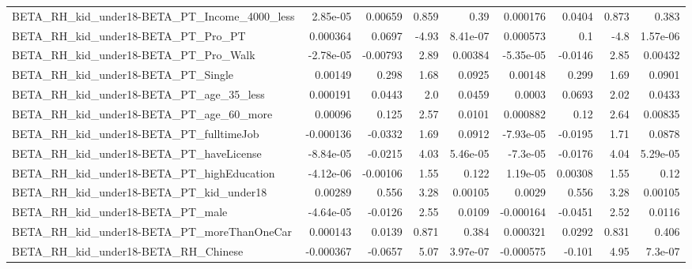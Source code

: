 \begin{tabular}{lrrrrrrrr}
BETA\_RH\_kid\_under18-BETA\_PT\_Income\_4000\_less       &    2.85e-05 &      0.00659 &     0.859 &     0.39 &   0.000176 &      0.0404 &        0.873 &         0.383 \\
BETA\_RH\_kid\_under18-BETA\_PT\_Pro\_PT                 &    0.000364 &       0.0697 &     -4.93 & 8.41e-07 &   0.000573 &         0.1 &         -4.8 &      1.57e-06 \\
BETA\_RH\_kid\_under18-BETA\_PT\_Pro\_Walk               &   -2.78e-05 &     -0.00793 &      2.89 &  0.00384 &  -5.35e-05 &     -0.0146 &         2.85 &       0.00432 \\
BETA\_RH\_kid\_under18-BETA\_PT\_Single                 &     0.00149 &        0.298 &      1.68 &   0.0925 &    0.00148 &       0.299 &         1.69 &        0.0901 \\
BETA\_RH\_kid\_under18-BETA\_PT\_age\_35\_less            &    0.000191 &       0.0443 &       2.0 &   0.0459 &     0.0003 &      0.0693 &         2.02 &        0.0433 \\
BETA\_RH\_kid\_under18-BETA\_PT\_age\_60\_more            &     0.00096 &        0.125 &      2.57 &   0.0101 &   0.000882 &        0.12 &         2.64 &       0.00835 \\
BETA\_RH\_kid\_under18-BETA\_PT\_fulltimeJob            &   -0.000136 &      -0.0332 &      1.69 &   0.0912 &  -7.93e-05 &     -0.0195 &         1.71 &        0.0878 \\
BETA\_RH\_kid\_under18-BETA\_PT\_haveLicense            &   -8.84e-05 &      -0.0215 &      4.03 & 5.46e-05 &   -7.3e-05 &     -0.0176 &         4.04 &      5.29e-05 \\
BETA\_RH\_kid\_under18-BETA\_PT\_highEducation          &   -4.12e-06 &     -0.00106 &      1.55 &    0.122 &   1.19e-05 &     0.00308 &         1.55 &          0.12 \\
BETA\_RH\_kid\_under18-BETA\_PT\_kid\_under18            &     0.00289 &        0.556 &      3.28 &  0.00105 &     0.0029 &       0.556 &         3.28 &       0.00105 \\
BETA\_RH\_kid\_under18-BETA\_PT\_male                   &   -4.64e-05 &      -0.0126 &      2.55 &   0.0109 &  -0.000164 &     -0.0451 &         2.52 &        0.0116 \\
BETA\_RH\_kid\_under18-BETA\_PT\_moreThanOneCar         &    0.000143 &       0.0139 &     0.871 &    0.384 &   0.000321 &      0.0292 &        0.831 &         0.406 \\
BETA\_RH\_kid\_under18-BETA\_RH\_Chinese                &   -0.000367 &      -0.0657 &      5.07 & 3.97e-07 &  -0.000575 &      -0.101 &         4.95 &       7.3e-07 \\

\end{tabular}
